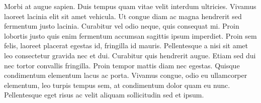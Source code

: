 Morbi at augue sapien. Duis tempus quam vitae velit interdum ultricies. Vivamus laoreet lacinia elit sit amet vehicula. Ut congue diam ac magna hendrerit sed fermentum justo lacinia. Curabitur vel odio neque, quis consequat mi. Proin lobortis justo quis enim fermentum accumsan sagittis ipsum imperdiet. Proin sem felis, laoreet placerat egestas id, fringilla id mauris. Pellentesque a nisi sit amet leo consectetur gravida nec et dui. Curabitur quis hendrerit augue. Etiam sed dui nec tortor convallis fringilla. Proin tempor mattis diam nec egestas. Quisque condimentum elementum lacus ac porta. Vivamus congue, odio eu ullamcorper elementum, leo turpis tempus sem, at condimentum dolor quam eu nunc. Pellentesque eget risus ac velit aliquam sollicitudin sed et ipsum. 







